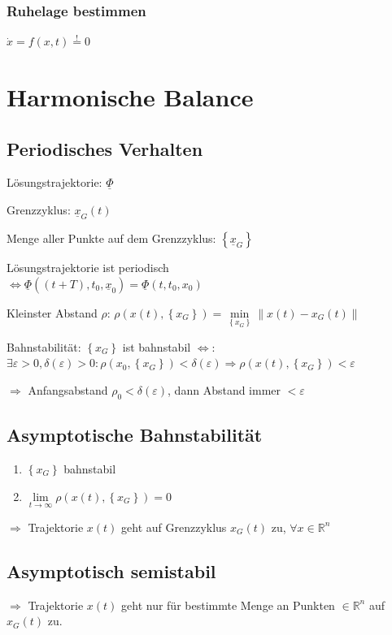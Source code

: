 \documentclass[german]{latex4ei/latex4ei_sheet}
\begin{document}
\subsubsection*{Ruhelage bestimmen}
$\dot x = f(x,t) \overset{!}{=} 0$


\section{Harmonische Balance}

\subsection{Periodisches Verhalten}

Lösungstrajektorie: $\underline{\Phi}$

Grenzzyklus: $\underline{x}_G(t)$

Menge aller Punkte auf dem Grenzzyklus: $\left\{ \underline{x}_G \right\}$

Lösungstrajektorie ist periodisch\\ $ \Leftrightarrow \underline{\Phi}\left( (t+T), t_0, \underline{x}_0 \right) = \underline{\Phi}\left( t,t_0,x_0 \right)$

Kleinster Abstand $\rho$: $\rho\left( x(t), \left\{ x_G \right\} \right) = \min\limits_{ \left\{ x_G \right\} } \|x(t) - x_G(t)\| $

Bahnstabilität: $\left\{ x_G \right\}$ ist bahnstabil $\Leftrightarrow$:
$\exists \varepsilon > 0, \delta(\varepsilon) > 0: \rho(x_0, \left\{ x_G \right\}) < \delta(\varepsilon) \Rightarrow \rho(x(t), \left\{ x_G \right\}) < \varepsilon$

$\Rightarrow$ Anfangsabstand $\rho_0 < \delta(\varepsilon)$, dann Abstand immer $< \varepsilon$

\subsection{Asymptotische Bahnstabilität}

\begin{enumerate}
  \item $\left\{ x_G \right\}$ bahnstabil
  \item $\lim\limits_{t \rightarrow \infty} \rho\left( x(t), \left\{ x_G \right\} \right) = 0 $
\end{enumerate}
$\Rightarrow$ Trajektorie $x(t)$ geht auf Grenzzyklus $x_G(t)$ zu, $\forall x \in \mathbb{R}^n$

\subsection{Asymptotisch semistabil}
$\Rightarrow$ Trajektorie $x(t)$ geht nur für bestimmte Menge an Punkten $\in \mathbb{R}^n$ auf $x_G(t)$ zu.
\end{document}
